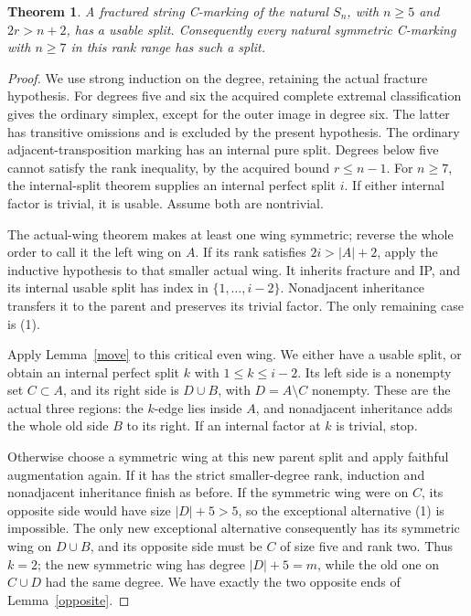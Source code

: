 \documentclass[11pt,a4paper]{article}
\newtheorem{theorem}[lemma]{Theorem}
\begin{document}
\begin{theorem}\label{usable}
A fractured string C-marking of the natural $S_n$, with
$n\ge5$ and $2r>n+2$, has a usable split.
Consequently every natural symmetric C-marking with $n\ge7$
in this rank range has such a split.
\end{theorem}
\begin{proof}
We use strong induction on the degree, retaining the actual fracture
hypothesis. For degrees five and six the acquired complete extremal
classification gives the ordinary simplex, except for the outer
image in degree six. The latter has transitive omissions and is
excluded by the present hypothesis. The ordinary adjacent-transposition
marking has an internal pure split. Degrees below five cannot satisfy
the rank inequality, by the acquired bound $r\le n-1$.
For $n\ge7$, the internal-split theorem supplies an internal perfect
split $i$. If either internal factor is trivial, it is usable.
Assume both are nontrivial.

The actual-wing theorem makes at least one wing symmetric; reverse
the whole order to call it the left wing on $A$. If its rank
satisfies $2i>|A|+2$, apply the inductive hypothesis to that
smaller actual wing. It inherits fracture and IP, and its internal
usable split has index in $\{1,\ldots,i-2\}$.
Nonadjacent inheritance transfers it to the parent and preserves its
trivial factor. The only remaining case is (1).

Apply Lemma~\ref{move} to this critical even wing. We either have
a usable split, or obtain an internal perfect split $k$ with
$1\le k\le i-2$. Its left side is a nonempty set $C\subset A$,
and its right side is $D\cup B$, with $D=A\setminus C$ nonempty.
These are the actual three regions: the $k$-edge lies inside $A$,
and nonadjacent inheritance adds the whole old side $B$ to its right.
If an internal factor at $k$ is trivial, stop.

Otherwise choose a symmetric wing at this new parent split and
apply faithful augmentation again. If it has the strict smaller-degree
rank, induction and nonadjacent inheritance finish as before. If the
symmetric wing were on $C$, its opposite side would have size
$|D|+5>5$, so the exceptional alternative (1) is impossible.
The only new exceptional alternative consequently has its symmetric
wing on $D\cup B$, and its opposite side must be $C$ of size five
and rank two. Thus $k=2$; the new symmetric wing has degree
$|D|+5=m$, while the old one on $C\cup D$ had the same degree.
We have exactly the two opposite ends of Lemma~\ref{opposite}.


\end{proof}
\end{document}
